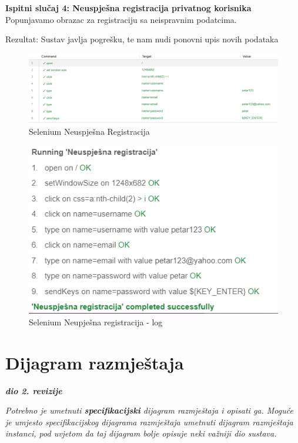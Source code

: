             \textbf{Ispitni slučaj 4: Neuspješna registracija privatnog korisnika}
    Popunjavamo obrazac za registraciju sa neispravnim podatcima.
    
    Rezultat: Sustav javlja pogrešku, te nam nudi ponovni upis novih podataka

    \begin{figure}[H]
			\includegraphics[scale=0.5]{slike/NeuspjesnaRegistracija2.png}
			\centering
			\caption{Selenium Neuspješna Registracija}
			\label{fig:promjene}
		          \end{figure}


\begin{figure}[H]
			\includegraphics[scale=0.8]{slike/NeuspjesnaRegistracija1.png}
			\centering
			\caption{Selenium Neupješna registracija - log}
			\label{fig:promjene}
		          \end{figure}
    
			
			\eject 
		
		
		\section{Dijagram razmještaja}
			
			\textbf{\textit{dio 2. revizije}}
			
			 \textit{Potrebno je umetnuti \textbf{specifikacijski} dijagram razmještaja i opisati ga. Moguće je umjesto specifikacijskog dijagrama razmještaja umetnuti dijagram razmještaja instanci, pod uvjetom da taj dijagram bolje opisuje neki važniji dio sustava.}

